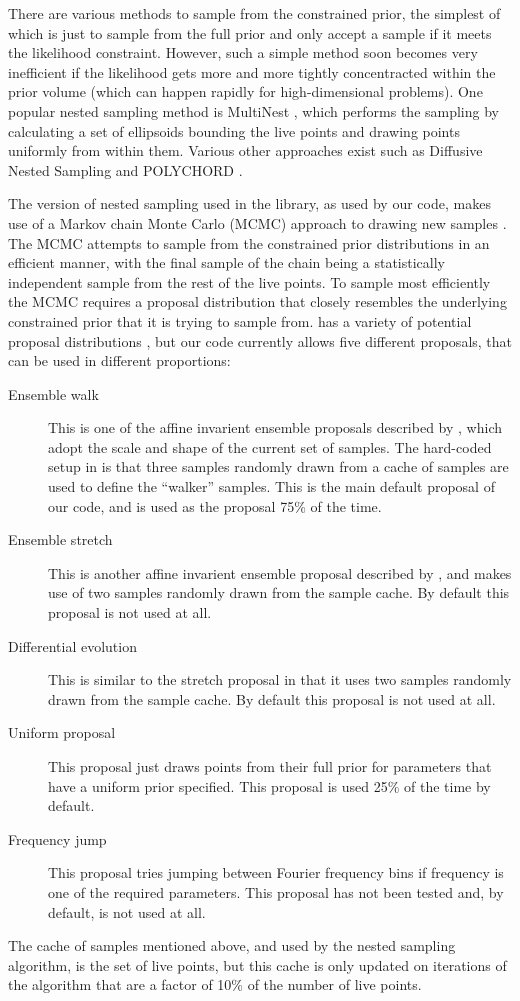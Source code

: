 There are various methods to sample from the constrained prior, the simplest of which is just to sample from the full
prior and only accept a sample if it meets the likelihood constraint. However, such a simple method soon becomes very
inefficient if the likelihood gets more and more tightly concentracted within the prior volume (which can happen rapidly
for high-dimensional problems). One popular nested sampling method is MultiNest \citep{2009MNRAS.398.1601F}, which performs
the sampling by calculating a set of ellipsoids bounding the live points and drawing points uniformly from within them.
Various other approaches exist such as Diffusive Nested Sampling \citep{Brewer2011,2016arXiv160603757B} and POLYCHORD \citep{2015MNRAS.450L..61H}.

The version of nested sampling used in the \lalinf library, as used by our code, makes use of a Markov chain Monte Carlo (MCMC) approach to
drawing new samples \citep{Veitch:2010}. The MCMC attempts to sample from the constrained prior distributions in an efficient manner, with
the final sample of the chain being a statistically independent sample from the rest of the live points. To sample most efficiently
the MCMC requires a proposal distribution that closely resembles the underlying constrained prior that it is trying to sample from.
\lalinf has a variety of potential proposal distributions \citep{2015PhRvD..91d2003V}, but our code currently allows five different
proposals, that can be used in different proportions:
\begin{description}
 \item[Ensemble walk] This is one of the affine invarient ensemble proposals described by \citet{GoodmanWeare}, which adopt the
 scale and shape of the current set of samples. The hard-coded setup in \lalinf is that three samples randomly drawn from a cache
 of samples are used to define the ``walker'' samples. This is the main default proposal of our code, and is used as the proposal
 75\% of the time.
 \item[Ensemble stretch] This is another affine invarient ensemble proposal described by \citet{GoodmanWeare}, and makes use of
 two samples randomly drawn from the sample cache. By default this proposal is not used at all.
 \item[Differential evolution] This is similar to the stretch proposal in that it uses two samples randomly drawn from the sample
 cache. By default this proposal is not used at all.
 \item[Uniform proposal] This proposal just draws points from their full prior for parameters that have a uniform prior specified.
 This proposal is used 25\% of the time by default.
 \item[Frequency jump] This proposal tries jumping between Fourier frequency bins if frequency is one of the required parameters.
 This proposal has not been tested and, by default, is not used at all.
\end{description}
The cache of samples mentioned above, and used by the nested sampling algorithm, is the set of live points, but this cache is
only updated on iterations of the algorithm that are a factor of 10\% of the number of live points.

